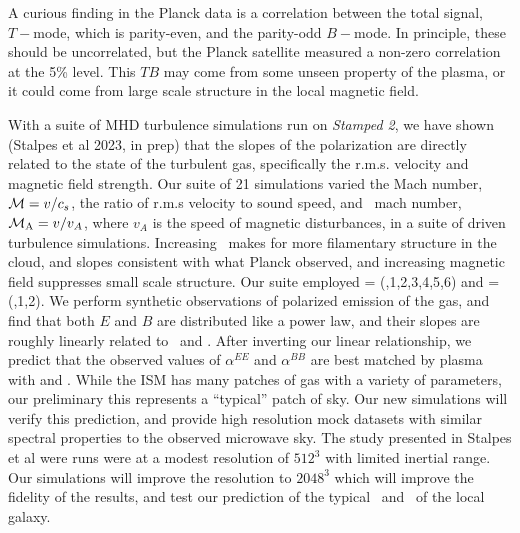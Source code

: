A curious finding in the Planck data is a correlation between the total
signal, $T-$mode, which is parity-even, and the parity-odd $B-$mode.  In principle, these should be
uncorrelated, but the Planck satellite measured a non-zero correlation at the
5\% level.  This $TB$ may come from some unseen property of the plasma, or it
could come from large scale structure in the local magnetic field.  

With a suite of MHD turbulence simulations run on \emph{Stamped 2}, we have shown (Stalpes et al 2023, in prep) that the slopes of the polarization
are directly related to the state of the turbulent gas, specifically the r.m.s.
velocity and magnetic field strength.  Our suite of 21 simulations 
varied the Mach number, $\mathcal{M}=v/c_s$, the ratio of
r.m.s velocity to sound speed, and \alf\ mach number, $\mathcal{M_{\rm{A}}}=v/v_A$, where
$v_A$ is the speed of magnetic disturbances, in a suite of driven turbulence
simulations.  Increasing \mach\ makes for more
filamentary structure in the cloud, and slopes consistent with what Planck
observed, and increasing magnetic field suppresses small scale structure.  Our suite employed \mach = (\half,1,2,3,4,5,6) and \alfmach=(\half,1,2).  
We perform synthetic observations of polarized emission of the gas, and find
that both $E$ and $B$ are distributed like a power law, and their slopes are
roughly
linearly related to \mach\ and \alfmach.
After inverting our linear relationship,  we predict that the observed values of $\alpha^{EE}$ and
$\alpha^{BB}$ are best matched by plasma with  and . While
the ISM has many patches of gas with a variety of parameters, our preliminary
this represents a ``typical'' patch of sky.  Our new simulations will verify
this prediction, and provide high resolution mock datasets with similar
spectral properties to the observed microwave sky.
The
study presented in Stalpes et al were runs were at a modest resolution of
$512^3$ with limited inertial range.   Our simulations will improve the
resolution to $2048^3$ which will improve the fidelity of the results, and test
our prediction of the typical \mach\ and \alfmach\ of the local galaxy.

